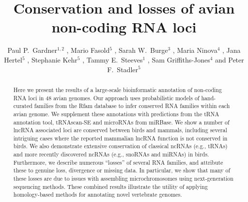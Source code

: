 \documentclass[10pt]{bmc_article}
\newenvironment{bmcformat}{\begin{raggedright}\baselineskip20pt\sloppy\setboolean{publ}{false}}{\end{raggedright}\baselineskip20pt\sloppy}
\begin{document}
\begin{bmcformat}

\title{Conservation and losses of avian non-coding RNA loci}

\author{
Paul P.\ Gardner\correspondingauthor$^{1,2}$
,
Mario Fasold$^5$
,
Sarah W.\ Burge$^3$
,
Maria Ninova$^4$
,
Jana Hertel$^5$
,
Stephanie Kehr$^5$
,
Tammy E.\ Steeves$^1$
,
Sam Griffiths-Jones$^4$
and
Peter F.\ Stadler\correspondingauthor$^5$
}
\address{
\iid(1) School of Biological Sciences, University of Canterbury, Private Bag 4800, Christchurch, New Zealand.
\iid(2) Biomolecular Interaction Centre, University of Canterbury, Private Bag 4800, Christchurch, New Zealand.
\iid(3) European Molecular Biology Laboratory, European Bioinformatics Institute, Hinxton, Cambridge, CB10 1SD, UK.
\iid(4) Faculty of Life Sciences, University of Manchester, Manchester, United Kingdom.
\iid(5) Bioinformatics Group, Department of Computer Science; and Interdisciplinary Center for Bioinformatics, University of Leipzig, H{\"a}rtelstrasse 16-18, D-04107 Leipzig, Germany
}

\maketitle

\begin{abstract}
Here we present the results of a large-scale bioinformatic annotation
of non-coding RNA loci in 48 avian genomes. Our approach uses
probabilistic models of hand-curated families from the Rfam database
to infer conserved RNA families within each avian genome. We
supplement these annotations with predictions from the tRNA annotation
tool, tRNAscan-SE and microRNAs from miRBase.  We show a number of
lncRNA associated loci are conserved between birds and mammals,
including several intriguing cases where the reported mammalian lncRNA
function is not conserved in birds.  We also demonstrate extensive
conservation of classical ncRNAs (e.g., tRNAs) and more recently
discovered ncRNAs (e.g., snoRNAs and miRNAs) in birds. Furthermore, we
describe numerous ``losses'' of several RNA families, and attribute
these to genuine loss, divergence or missing data.  In particular, we
show that many of these losses are due to issues with assembling
microchromosomes using next-generation sequencing methods. These
combined results illustrate the utility of applying homology-based
methods for annotating novel vertebrate genomes.
\end{abstract}




\end{bmcformat}
\end{document}

